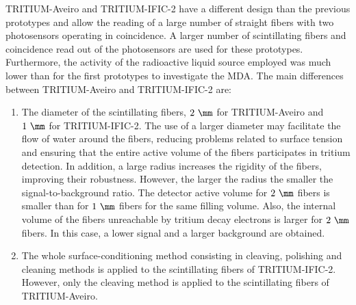TRITIUM-Aveiro and TRITIUM-IFIC-2 have a different design than the previous prototypes and allow the reading of a large number of straight fibers with two photosensors operating in coincidence. A larger number of scintillating fibers and coincidence read out of the photosensors are used for these prototypes. Furthermore, the activity of the radioactive liquid source employed was much lower than for the first prototypes to investigate the MDA. The main differences between TRITIUM-Aveiro and TRITIUM-IFIC-2 are:

\begin{enumerate}

\item{} The diameter of the scintillating fibers, $2~\mm$ for TRITIUM-Aveiro and $1~\mm$ for TRITIUM-IFIC-2. The use of a larger diameter may facilitate the flow of water around the fibers, reducing problems related to surface tension and ensuring that the entire active volume of the fibers participates in tritium detection. In addition, a large radius increases the rigidity of the fibers, improving their robustness. However, the larger the radius the smaller the signal-to-background ratio. The detector active volume for $2~\mm$ fibers is smaller than for $1~\mm$ fibers for the same filling volume. Also, the internal volume of the fibers unreachable by tritium decay electrons is larger for $2~\mm$ fibers. In this case, a lower signal and a larger background are obtained.


\item{} The whole surface-conditioning method consisting in cleaving, polishing and cleaning methods is applied to the scintillating fibers of TRITIUM-IFIC-2. However, only the cleaving method is applied to the scintillating fibers of TRITIUM-Aveiro.


\end{enumerate}
